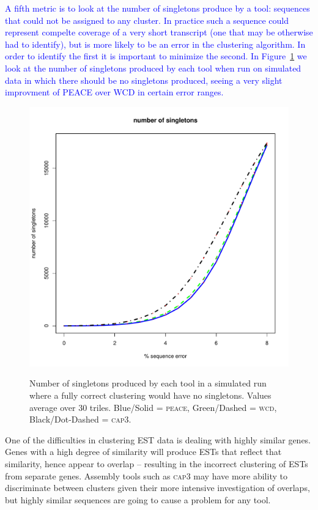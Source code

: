\documentclass[a4paper,12pt]{article}
\newcommand{\mc}[1]{\textcolor{blue}{#1}}
\begin{document}
\begin{appendix}
\mc{A fifth metric is to look at the number of singletons produce by a
  tool:  sequences that  could not  be  assigned to  any cluster.   In
  practice such a sequence could represent compelte coverage of a very
  short transcript (one that may be otherwise had to identify), but is
  more likely to be an error in the clustering algorithm.  In order to
  identify  the first  it is  important  to minimize  the second.   In
  Figure~\ref{singletons} we look at the number of singletons produced
  by each tool when run on  simulated data in which there should be no
  singletons produced,  seeing a very slight improvment  of PEACE over
  WCD in certain error ranges.}

\begin{figure}[tbp]
\centerline{
\label{dups}
\includegraphics[scale=0.35]{pics.d/singletons_40.pdf}
}
\caption{Number of singletons produced by each tool in a simulated run
  where a fully correct clustering would have no singletons.  Values
  average over 30 triles.  Blue/Solid = \textsc{peace}, Green/Dashed =
  \textsc{wcd}, Black/Dot-Dashed = \textsc{cap3}.}\label{singletons}
\end{figure}

One of the difficulties in clustering EST data is dealing with
highly similar genes.  Genes with a high degree of similarity will
produce ESTs that reflect that similarity, hence appear to overlap --
resulting in the incorrect clustering of ESTs from separate genes.  Assembly tools
such as \textsc{cap3} may have more ability to discriminate between clusters
given their more intensive investigation of overlaps, but highly
similar sequences are going to cause a problem for any tool. 


\end{appendix}
\end{document}
